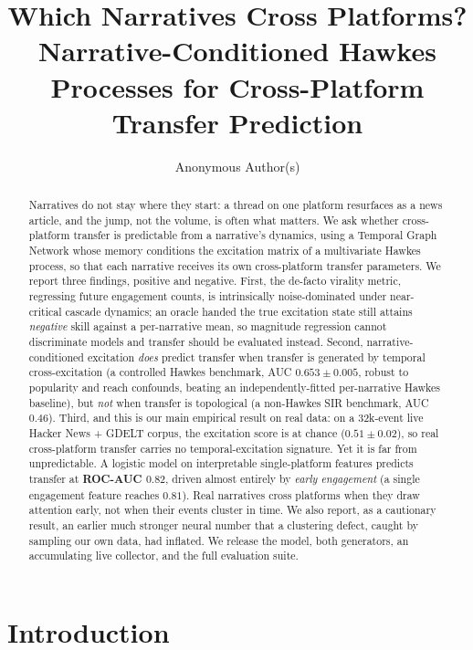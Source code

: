 \documentclass[11pt]{article}
\title{Which Narratives Cross Platforms? \\ Narrative-Conditioned Hawkes
  Processes for Cross-Platform Transfer Prediction}
\author{Anonymous Author(s)}
\begin{document}
\maketitle

\begin{abstract}
Narratives do not stay where they start: a thread on one platform resurfaces as
a news article, and the jump, not the volume, is often what matters. We
ask whether cross-platform transfer is predictable from a narrative's dynamics,
using a Temporal Graph Network whose memory conditions the excitation matrix of
a multivariate Hawkes process, so that each narrative receives its own
cross-platform transfer parameters. We report three findings, positive and
negative. First, the de-facto virality metric, regressing future engagement
counts, is intrinsically noise-dominated under near-critical cascade
dynamics; an oracle handed the true excitation state still attains \emph{negative}
skill against a per-narrative mean, so magnitude regression cannot discriminate
models and transfer should be evaluated instead. Second, narrative-conditioned
excitation \emph{does} predict transfer when transfer is generated by temporal
cross-excitation (a controlled Hawkes benchmark, AUC $0.653 \pm 0.005$, robust
to popularity and reach confounds, beating an independently-fitted per-narrative
Hawkes baseline), but \emph{not} when transfer is topological (a non-Hawkes SIR
benchmark, AUC $0.46$). Third, and this is our main empirical result on real data: on
a 32k-event live Hacker News + GDELT corpus, the excitation score is at chance
($0.51 \pm 0.02$), so real cross-platform transfer carries no temporal-excitation
signature. Yet it is far from unpredictable. A logistic model on interpretable
single-platform features predicts transfer at \textbf{ROC-AUC $0.82$}, driven
almost entirely by \emph{early engagement} (a single engagement feature reaches
$0.81$). Real narratives cross platforms when they draw attention early, not
when their events cluster in time. We also report, as a cautionary result, an
earlier much stronger neural number that a clustering defect, caught by
sampling our own data, had inflated. We release the model, both generators,
an accumulating live collector, and the full evaluation suite.
\end{abstract}

\section{Introduction}
\label{sec:intro}
\end{document}
